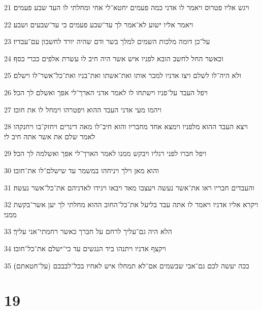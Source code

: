\par 21 ויגש אליו פטרוס ויאמר לו אדני כמה פעמים יחטא־לי אחי ומחלתי לו העד שבע פעמים׃
\par 22 ויאמר אליו ישוע לא־אמר לך עד־שבע פעמים כי עד־שבעים ושבע׃
\par 23 על־כן דומה מלכות השמים למלך בשר ודם שהיה יורד לחשבון עם־עבדיו׃
\par 24 וכאשר החל לחשב הובא לפניו איש אשר היה חיב לו עשרת אלפים ככרי כסף׃
\par 25 ולא היה־לו לשלם ויצו אדניו למכר אותו ואת־אשתו ואת־בניו ואת־כל־אשר־לו וישלם׃
\par 26 ויפל העבד על־פניו וישתחו לו לאמר אדני הארך־לי אפך ואשלם לך הכל׃
\par 27 ויהמו מעי אדני העבד ההוא ויפטרהו וימחל לו את חובו׃
\par 28 ויצא העבד ההוא מלפניו וימצא אחד מחבריו והוא חיב־לו מאה דינרים ויחזק־בו ויחנקהו לאמר שלם את אשר אתה חיב לי׃
\par 29 ויפל חברו לפני רגליו ויבקש ממנו לאמר הארך־לי אפך ואשלמה לך הכל׃
\par 30 והוא מאן וילך ויניחהו במשמר עד שישלם־לו את־חובו׃
\par 31 והעבדים חבריו ראו את־אשר נעשה ויעצבו מאד ויבאו ויגידו לאדניהם את־כל־אשר נעשה׃
\par 32 ויקרא אליו אדניו ויאמר לו אתה עבד בליעל את־כל־החוב ההוא מחלתי לך יען אשר־בקשת ממני׃
\par 33 הלא היה גם־עליך לרחם על חברך כאשר רחמתי־אני עליך׃
\par 34 ויקצף אדניו ויתנהו ביד הנגשים עד כי־ישלם את־כל־חובו׃
\par 35 ככה יעשה לכם גם־אבי שבשמים אם־לא תמחלו איש לאחיו בכל־לבבכם (על־חטאתם)׃

\chapter{19}

